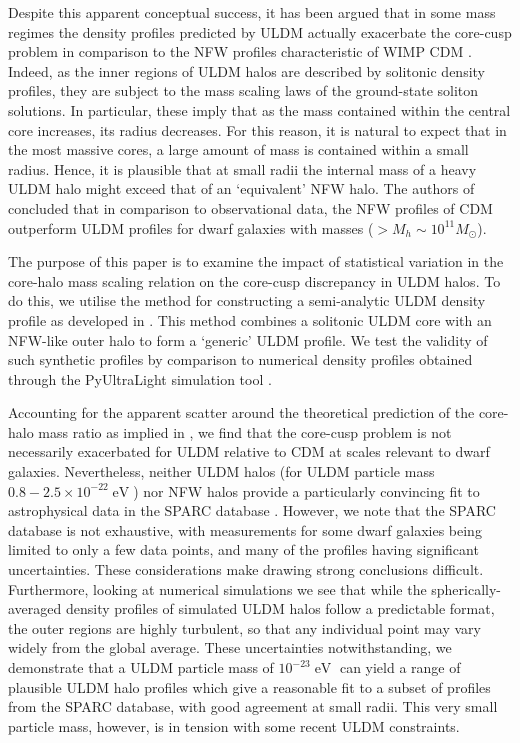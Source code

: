 \documentclass[a4paper,11pt]{article}
\begin{document}
Despite this apparent conceptual success, it has  been argued that in some mass regimes the density profiles predicted by ULDM actually exacerbate the core-cusp problem in comparison to the NFW profiles characteristic of WIMP CDM \cite{Robles:2018fur}. Indeed, as the inner regions of ULDM halos are described by solitonic density profiles, they are subject to the mass scaling laws of the ground-state soliton solutions. In particular, these imply that as the mass contained within the central core increases, its radius decreases. For this reason, it is natural to expect that in the most massive cores, a large amount of mass is contained within a small radius. Hence, it is plausible that at small radii the internal mass of a heavy ULDM halo might exceed that of an `equivalent' NFW halo. The authors of \cite{Robles:2018fur} concluded that in comparison to observational data, the NFW profiles of CDM outperform ULDM profiles for dwarf galaxies with masses ($> M_h \sim 10^{11} M_{\odot}$). 

The purpose of this paper is to examine the impact of statistical variation in the core-halo mass scaling relation on the core-cusp discrepancy in ULDM halos. To do this, we utilise the method for constructing a semi-analytic ULDM density profile as developed in \cite{Robles:2018fur}. This method combines a solitonic ULDM core with an NFW-like outer halo to form a `generic' ULDM profile. We test the validity of such synthetic profiles by comparison to numerical density profiles obtained through the PyUltraLight simulation tool \cite{Edwards:2018ccc}.

Accounting for the apparent scatter around the theoretical prediction of the core-halo mass ratio as implied in \cite{Schive:2014hza}, we find that the core-cusp problem is not necessarily exacerbated for ULDM relative to CDM at scales relevant to dwarf galaxies. Nevertheless,  neither ULDM halos (for ULDM particle mass $0.8-2.5\times 10^{-22} \operatorname{eV}$)
nor NFW halos provide a particularly convincing fit to astrophysical data in the SPARC database \cite{Lelli:2016zqa}. However, we note that the SPARC database is not exhaustive, with measurements for some dwarf galaxies being limited to only a few data points, and many of the profiles having significant uncertainties. These considerations make drawing strong conclusions difficult. Furthermore, looking at numerical simulations we see that while the spherically-averaged density profiles of simulated ULDM halos follow a predictable format, the outer regions are highly turbulent, so that any individual point may vary widely from the global average. These uncertainties notwithstanding, we demonstrate that a ULDM particle mass of $10^{-23}\operatorname{eV}$ can yield a range of plausible ULDM halo profiles which give a reasonable fit to a subset of profiles from the SPARC database, with good agreement at small radii. This very small particle mass, however, is in tension with some recent ULDM constraints. 
\end{document}
